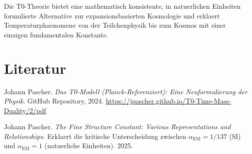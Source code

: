 \documentclass[12pt,a4paper]{article}
\begin{document}
	\begin{revolutionary}
		Die T0-Theorie bietet eine mathematisch konsistente, in natuerlichen Einheiten formulierte Alternative zur expansionsbasierten Kosmologie und erklaert Temperaturphaenomene von der Teilchenphysik bis zum Kosmos mit einer einzigen fundamentalen Konstante.
	\end{revolutionary}
	
	\section{Literatur}
	
	\begin{thebibliography}{2}
		Johann Pascher.
		\textit{Das T0-Modell (Planck-Referenziert): Eine Neuformulierung der Physik}.
		GitHub Repository, 2024.
		\url{https://jpascher.github.io/T0-Time-Mass-Duality/2/pdf}
		
		Johann Pascher.
		\textit{The Fine Structure Constant: Various Representations and Relationships}.
		Erklaert die kritische Unterscheidung zwischen $\alpha_{\text{EM}} = 1/137$ (SI) und $\alpha_{\text{EM}} = 1$ (natuerliche Einheiten).
		2025.
	\end{thebibliography}
	
\end{document}
